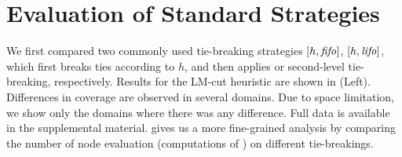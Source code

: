 
\section{Evaluation of  Standard Strategies}
\label{sec:eval-common-strategies}

We first compared two commonly used tie-breaking strategies $[h,\mbox{\textit{fifo}}]$, $[h,\mbox{\textit{lifo}}]$, which
first breaks ties according to $h$, and then applies \fifo or \lifo
second-level tie-breaking, respectively.
Results for the LM-cut heuristic \cite{Helmert2009} are
shown in  (Left).
Differences in coverage are observed in several domains.
Due to space limitation, we show only the domains
where there was any difference. Full data is available in the
supplemental material. 
% 
 gives us a
more fine-grained analysis by comparing the number of node evaluation
(computations of \lmcut) on different tie-breakings.


\begin{table}[tb]
 \centering {}
 
 
 \caption{Experiments with 5 min, 2GB setting,
 comparing the coverages of \fifo and \lifo
 tie-breaking, with (left) and without (right) the
 conventional first-level $h$-based tie-breaking.  Due to space, 
only domains with results that differ are shown.
(Full results are
 available in the supplemental material.)
 }
 \label{single-coverage}
\end{table}


